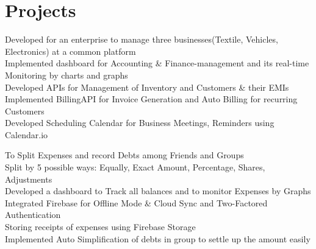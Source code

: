 \documentclass[]{jaydeep-resume-openfont}
\begin{document}
\begin{minipage}[t]{0.70\textwidth}

\section{Projects}

\textbullet{} Developed for an enterprise to manage three businesses(Textile, Vehicles, Electronics)  at a common platform \\
\textbullet{} Implemented dashboard for Accounting \& Finance-management and its real-time Monitoring by charts and graphs \\
\textbullet{} Developed APIs for Management of Inventory and Customers \& their EMIs  \\
\textbullet{} Implemented BillingAPI for Invoice Generation and Auto Billing for recurring Customers  \\
\textbullet{} Developed Scheduling Calendar for Business Meetings, Reminders using Calendar.io \\
\sectionsep

\textbullet{} To Split Expenses and record Debts among Friends and Groups\\
\textbullet{} Split by 5 possible ways: Equally, Exact Amount, Percentage, Shares, Adjustments \\
\textbullet{} Developed a dashboard to Track all balances  and to monitor Expenses by Graphs\\
\textbullet{} Integrated Firebase for Offline Mode \& Cloud Sync and Two-Factored Authentication\\
\textbullet{} Storing receipts of expenses using Firebase Storage\\
\textbullet{} Implemented Auto Simplification of debts in group to settle up the amount easily \\
\sectionsep


\end{minipage}
\end{document}
